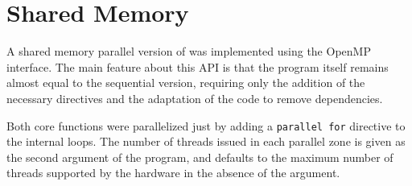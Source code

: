 \section{Shared Memory}
\label{sec:omp}


A shared memory parallel version of \polu was implemented using the OpenMP interface. The main feature about this API is that the program itself remains almost equal to the sequential version, requiring only the addition of the necessary directives and the adaptation of the code to remove dependencies.

Both core functions were parallelized just by adding a \texttt{parallel for} directive to the internal loops. The number of threads issued in each parallel zone is given as the second argument of the program, and defaults to the maximum number of threads supported by the hardware in the absence of the argument.



